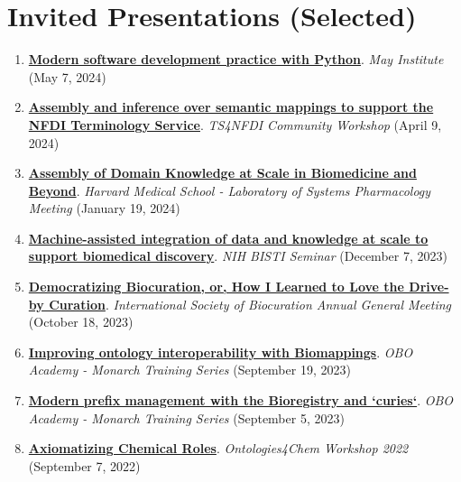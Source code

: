 \documentclass[10pt,a4paper,sans]{moderncv} %
\begin{document}
\section{Invited Presentations (Selected)}
\begin{enumerate}
\itemsep0.5em
    \item \textbf{\href{https://docs.google.com/document/d/1vP7ZA29J0PEI3CsMm4iGPq4DQG1sEgBvqoucfPga8JI/edit?usp=sharing}{Modern software development practice with Python}}. \textit{May Institute} (May 7, 2024)

    \item \textbf{\href{https://bit.ly/semra4nfdi}{Assembly and inference over semantic mappings to support the NFDI Terminology Service}}. \textit{TS4NFDI Community Workshop} (April 9, 2024)

    \item \textbf{\href{https://bit.ly/cth-lsp-2024}{Assembly of Domain Knowledge at Scale in Biomedicine and Beyond}}. \textit{Harvard Medical School - Laboratory of Systems Pharmacology Meeting} (January 19, 2024)

    \item \textbf{\href{https://www.dropbox.com/scl/fi/phd98s1oql2knjp2v9lhq/2023-12-07_hoyt_gyori_nih_bisti.pdf?rlkey=qlorv5a1d79ofhhkatjpmj3tb&dl=0}{Machine-assisted integration of data and knowledge at scale to support biomedical discovery}}. \textit{NIH BISTI Seminar} (December 7, 2023)

    \item \textbf{\href{https://docs.google.com/presentation/d/1D6P-1hQefXU_yRODSJkOFLH3tPxsk9Abi20ycA0xKWU/edit?usp=sharing}{Democratizing Biocuration, or, How I Learned to Love the Drive-by Curation}}. \textit{International Society of Biocuration Annual General Meeting} (October 18, 2023)

    \item \textbf{\href{https://bit.ly/obo-academy-biomappings}{Improving ontology interoperability with Biomappings}}. \textit{OBO Academy - Monarch Training Series} (September 19, 2023)

    \item \textbf{\href{https://docs.google.com/presentation/d/1Hyi9t_wwoMAFskWtDBMHGpAw7ZwTQx-3RKrFdTFYB88/edit?usp=sharing}{Modern prefix management with the Bioregistry and `curies`}}. \textit{OBO Academy - Monarch Training Series} (September 5, 2023)

    \item \textbf{\href{https://bit.ly/ontologies4chem-crog}{Axiomatizing Chemical Roles}}. \textit{Ontologies4Chem Workshop 2022} (September 7, 2022)


\end{enumerate}
\end{document}
